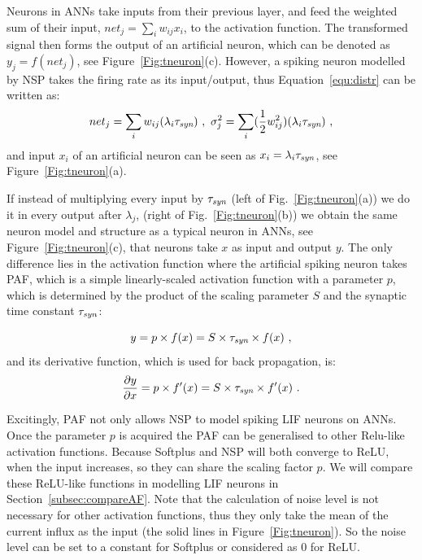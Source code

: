 	Neurons in ANNs take inputs from their previous layer, and feed the weighted sum of their input, $net_j = \sum_i w_{ij}x_i$, to the activation function.
	The transformed signal then forms the output of an artificial neuron, which can be denoted as $y_j=f(net_j)$, see Figure~\ref{Fig:tneuron}(c).
	However, a spiking neuron modelled by NSP takes the firing rate as its input/output, thus Equation~\ref{equ:distr} can be written as:
	\begin{equation}
	net_j = \sum_i w_{ij}(\lambda_{i}\tau_{\textit{\textrm{syn}}})~,
	~\sigma^2_j= \sum_i (\frac{1}{2} w_{ij}^2)(\lambda_{i}\tau_{\textit{\textrm{syn}}})~, 
	\label{equ:mi_input}
	\end{equation}
	and input $ x_i $ of an artificial neuron can be seen as $x_i=\lambda_{i}\tau_{\textit{\textrm{syn}}}$, see Figure~\ref{Fig:tneuron}(a).
	
	
	If instead of multiplying every input by $\tau_{\textit{\textrm{syn}}}$ (left of Fig.~\ref{Fig:tneuron}(a)) we do it in every output after $\lambda_j$, (right of Fig.~\ref{Fig:tneuron}(b)) we obtain the same neuron model and structure as a typical neuron in ANNs, see Figure~\ref{Fig:tneuron}(c), that neurons take $x$ as input and output $y$.
	The only difference lies in the activation function where the artificial spiking neuron takes PAF, which is a simple linearly-scaled activation function with a parameter $p$, which is determined by the product of the scaling parameter $S$ and the synaptic time constant $\tau_{\textit{\textrm{syn}}}$:
	
	\begin{equation}
	y = p \times f(x) = S \times \tau_{\textit{\textrm{syn}}} \times f(x)~,
	\label{equ:PAF}
	\end{equation}
	and its derivative function, which is used for back propagation, is:
	\begin{equation}
	\frac{\partial y}{\partial x} = p \times f'(x) = S \times \tau_{\textit{\textrm{syn}}} \times f'(x)~.
	\end{equation}
	
	Excitingly, PAF not only allows NSP to model spiking LIF neurons on ANNs.
	Once the parameter $p$ is acquired the PAF can be generalised to other Relu-like activation functions.
	Because Softplus and NSP will both converge to ReLU, when the input increases, so they can share the scaling factor $p$.
	We will compare these ReLU-like functions in modelling LIF neurons in Section~\ref{subsec:compareAF}.
	Note that the calculation of noise level is not necessary for other activation functions, thus they only take the mean of the current influx as the input (the solid lines in Figure~\ref{Fig:tneuron}).
	So the noise level can be set to a constant for Softplus or considered as 0 for ReLU.
	
